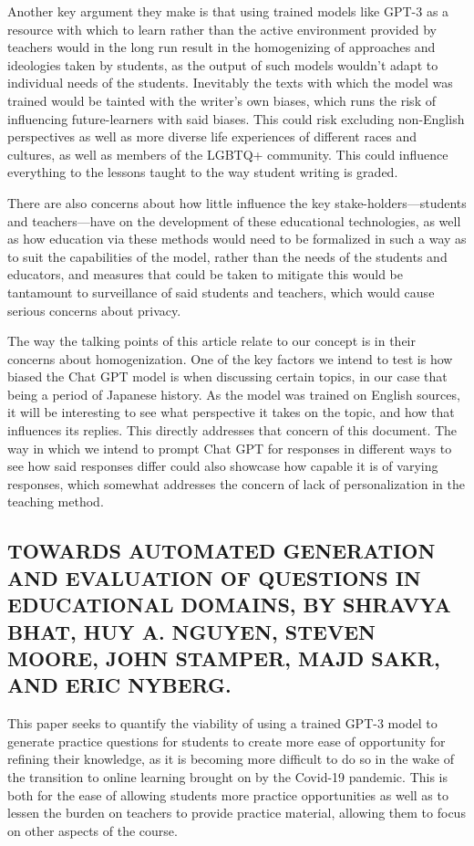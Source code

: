 \documentclass[letterpaper, 10pt, conference]{ieeeconf}
\begin{document}
	Another key argument they make is that using trained models like GPT-3 as a resource with which to learn rather than the active environment provided by teachers would in the long run result in the homogenizing of approaches and ideologies taken by students, as the output of such models wouldn’t adapt to individual needs of the students. Inevitably the texts with which the model was trained would be tainted with the writer’s own biases, which runs the risk of influencing future-learners with said biases. This could risk excluding non-English perspectives as well as more diverse life experiences of different races and cultures, as well as members of the LGBTQ+ community. This could influence everything to the lessons taught to the way student writing is graded.

	There are also concerns about how little influence the key stake-holders—students and teachers—have on the development of these educational technologies, as well as how education via these methods would need to be formalized in such a way as to suit the capabilities of the model, rather than the needs of the students and educators, and measures that could be taken to mitigate this would be tantamount to surveillance of said students and teachers, which would cause serious concerns about privacy.

	The way the talking points of this article relate to our concept is in their concerns about homogenization. One of the key factors we intend to test is how biased the Chat GPT model is when discussing certain topics, in our case that being a period of Japanese history. As the model was trained on English sources, it will be interesting to see what perspective it takes on the topic, and how that influences its replies. This directly addresses that concern of this document. The way in which we intend to prompt Chat GPT for responses in different ways to see how said responses differ could also showcase how capable it is of varying responses, which somewhat addresses the concern of lack of personalization in the teaching method.

        \subsection{TOWARDS AUTOMATED GENERATION AND EVALUATION OF QUESTIONS IN EDUCATIONAL DOMAINS, BY SHRAVYA BHAT, HUY A. NGUYEN, STEVEN MOORE, JOHN STAMPER, MAJD SAKR, AND ERIC NYBERG.}

        This paper seeks to quantify the viability of using a trained GPT-3 model to generate practice questions for students to create more ease of opportunity for refining their knowledge, as it is becoming more difficult to do so in the wake of the transition to online learning brought on by the Covid-19 pandemic. This is both for the ease of allowing students more practice opportunities as well as to lessen the burden on teachers to provide practice material, allowing them to focus on other aspects of the course.
\end{document}
